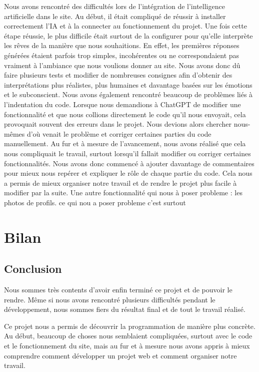 \documentclass[a4paper, 12pt, twoside]{article}
\begin{document}
Nous avons rencontré des difficultés lors de l’intégration de l’intelligence artificielle dans le site. Au début, il était compliqué de réussir à installer correctement l’IA et à la connecter au fonctionnement du projet. Une fois cette étape réussie, le plus difficile était surtout de la configurer pour qu’elle interprète les rêves de la manière que nous souhaitions.
En effet, les premières réponses générées étaient parfois trop simples, incohérentes ou ne correspondaient pas vraiment à l’ambiance que nous voulions donner au site. Nous avons donc dû faire plusieurs tests et modifier de nombreuses consignes afin d’obtenir des interprétations plus réalistes, plus humaines et davantage basées sur les émotions et le subconscient.
Nous avons également rencontré beaucoup de problèmes liés à l’indentation du code. Lorsque nous demandions à ChatGPT de modifier une fonctionnalité et que nous collions directement le code qu’il nous envoyait, cela provoquait souvent des erreurs dans le projet. Nous devions alors chercher nous-mêmes d’où venait le problème et corriger certaines parties du code manuellement.
Au fur et à mesure de l’avancement, nous avons réalisé que cela nous compliquait le travail, surtout lorsqu’il fallait modifier ou corriger certaines fonctionnalités.
Nous avons donc commencé à ajouter davantage de commentaires pour mieux nous repérer et expliquer le rôle de chaque partie du code. Cela nous a permis de mieux organiser notre travail et de rendre le projet plus facile à modifier par la suite.
Une autre fonctionnalité qui nous à poser probleme : les photos de profils. ce qui nou a poser probleme c'est surtout 






\section{Bilan}






	\subsection{Conclusion}
    Nous sommes très contents d’avoir enfin terminé ce projet et de pouvoir le rendre. Même si nous avons rencontré plusieurs difficultés pendant le développement, nous sommes fiers du résultat final et de tout le travail réalisé.

Ce projet nous a permis de découvrir la programmation de manière plus concrète. Au début, beaucoup de choses nous semblaient compliquées, surtout avec le code et le fonctionnement du site, mais au fur et à mesure nous avons appris à mieux comprendre comment développer un projet web et comment organiser notre travail.
\end{document}
